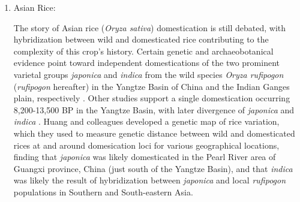 \documentclass[11pt]{article}
\newcommand{\gmj}[1]{\textcolor{blue}{ \emph{\scriptsize  #1}} } %
\begin{document}
\begin{enumerate}












\item{Asian Rice:}

The story of Asian rice (\emph{Oryza sativa}) domestication is still debated, with hybridization between wild and domesticated rice contributing to the complexity of this crop's history.
Certain genetic and archaeobotanical evidence point toward independent domestications of the two prominent varietal groups \emph{japonica} and \emph{indica} from the wild species \emph{Oryza rufipogon} (\emph{rufipogon} hereafter) in the Yangtze Basin of China and the Indian Ganges plain, respectively \cite{fuller2010consilience}.
Other studies support a single domestication occurring 8,200-13,500 BP in the Yangtze Basin, with later divergence of \emph{japonica} and \emph{indica} \cite{molina2011molecular}.
Huang and colleagues \cite{Huang2012} developed a genetic map of rice variation, which they used to measure genetic distance between wild and domesticated rices at and around domesication loci for various geographical locations, finding that \emph{japonica} was likely domesticated in the Pearl River area of Guangxi province, China (just south of the Yangtze Basin), and that \emph{indica} was likely the result of hybridization between \emph{japonica} and local \emph{rufipogon} populations in Southern and South-eastern Asia. %



\end{enumerate}
\end{document}
